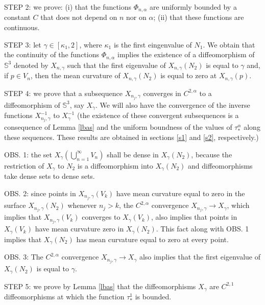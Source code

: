 \documentclass{article}
\def\S3{{\mathbb S^3}}
\begin{document}
\noindent
\hspace{.05in}STEP 2: we prove: (i) that the functions  $\Phi_{n,\alpha}$ are uniformly bounded by a constant $C$ that does not depend on $n$ nor on $\alpha$; (ii) that these functions are continuous.\medskip

\noindent
\hspace{.05in}STEP 3: let $\gamma\in [\kappa_1,2]$, where $\kappa_1$ is the first eingenvalue of $N_1$. We obtain that the continuity of the functions $\Phi_{n,\alpha}$ implies the existence of a diffeomorphism  of $\S3$ denoted by $X_{n,\gamma}$ such that the first eigenvalue of $X_{n,\gamma}(N_2)$ is equal to $\gamma$ and, if $p\in V_n$, then the mean curvature of $X_{n,\gamma}(N_2)$ is equal to zero at $X_{n,\gamma}(p)$.\medskip

\noindent
\hspace{.05in}STEP 4: we prove that a subsequence $X_{n_j,\gamma}$ converges in $C^{2,\alpha}$ to a diffeomorphism of $\S3$, say $X_\gamma$. We will also have the convergence of the inverse functions $X_{n_j,\gamma}^{-1}$ to $X_{\gamma}^{-1}$ (the existence of these convergent subsequences is a consequence of Lemma \ref{lbas} and the uniform boundness  of  the values of $\tau_*^\alpha$ along these sequences. These results are obtained in sections \ref{s1} and \ref{s2}, respectively.) 

\noindent
OBS. 1: the set $X_\gamma(\bigcup_{n=1}^\infty V_n)$ shall be dense in $X_\gamma(N_2)$,
because the restriction of $X_\gamma$ to $N_2$ is a diffeomorphism into $X_\gamma(N_2)$ and diffeomorphisms take dense sets to dense sets.

\noindent
OBS. 2: since points in $X_{n_j,\gamma}(V_k)$ have mean curvature equal to zero in the surface $X_{n_j,\gamma}(N_2)$ whenever
$n_j>k$, the $C^{2,\alpha}$ convergence $X_{n_j,\gamma}\to X_\gamma$, which  implies that $X_{n_j,\gamma}(V_k)$ converges to
$X_\gamma(V_k)$, also implies that points in $X_\gamma(V_k)$ have mean curvature zero in $X_\gamma(N_2)$. This fact along with OBS. 1 implies that $X_\gamma(N_2)$ has mean curvature equal to zero at every point.

\noindent
OBS. 3: The $C^{2,\alpha}$ convergence $X_{n_j,\gamma}\to X_\gamma$ also implies that the first eigenvalue of $X_\gamma(N_2)$ is equal to $\gamma$. \medskip

\noindent
\hspace{.05in}STEP 5: we prove by Lemma \ref{lbas} that the diffeomorphisms $X_\gamma$ are $C^{2,1}$ diffeomorphisms at which the function $\tau^1_*$ is bounded. \medskip
\end{document}
